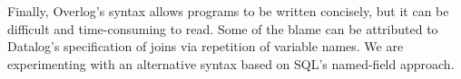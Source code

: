 Finally, Overlog's syntax allows programs to be written concisely, but it can be
difficult and time-consuming to read. Some of the blame can be attributed to
Datalog's specification of joins via repetition of variable names. We are
experimenting with an alternative syntax based on SQL's named-field approach.





